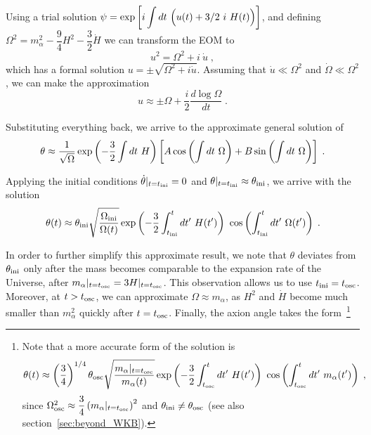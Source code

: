 \documentclass[11pt,a4paper]{article}
\begin{document}
Using a trial solution $\psi = \exp\left[  i \displaystyle \int d t \ \Big( u(t) +3/2 \ i \ H(t) \Big)  \right]$, and defining $\Omega^2 = m_{\alpha}^2 - \dfrac{9}{4} H^2 -  \dfrac{3}{2} \dot H $ we can transform the EOM to 
%
\begin{equation}
	u^2 = \Omega^2 + i \ \dot u \; ,
	\label{eq:eom_of_u}
\end{equation}
%
which has a formal solution $u = \pm \sqrt{\Omega^2 + i \dot u}$. Assuming that $\dot u \ll \Omega^2$ and $\dot \Omega \ll \Omega^2$, we can make the approximation
%
\begin{equation}
	u \approx \pm \Omega + \dfrac{i}{2} \dfrac{d \log \Omega}{d t} \;.
	\label{eq:u_approx}
\end{equation}


Substituting everything back, we arrive to the approximate general solution of  
%
\begin{equation}
	\theta \approx \dfrac{1}{\sqrt{\Omega}} \exp\left( -\dfrac{3}{2} \int d t \ H \right) \left[  A \cos\left(  \int d t \ \Omega \right) +  B \sin\left(  \int d t \ \Omega \right)     \right] \;. 
	\label{eq:general_solution_eom_approx}
\end{equation}

Applying the initial conditions $ \dot \theta |_{t=t_{\rm ini}{}} = 0$ and  $\theta|_{t=t_{\rm ini}{}} \approx \theta_{\rm ini}{}$, we arrive with the solution 
%
\begin{equation}
	\theta(t) \approx \theta_{\rm ini}{} \sqrt{ \dfrac{ \Omega_{\rm ini} }{\Omega (t)} } \exp\left( -\dfrac{3}{2} \int_{t_{\rm ini}{}}^t d t^\prime  \ H(t^\prime) \right) \  \cos\left(  \int_{t_{\rm ini}{}}^t d t^\prime  \ \Omega(t^\prime) \right)   \;.
	\label{eq:solution_eom_approx} 
\end{equation}


In order to further simplify this approximate result, we note that $\theta$ deviates from $\theta_{\rm ini}{}$ only after the mass becomes comparable to the expansion rate of the Universe, \ie after $m_{\alpha}|_{t = t_{\rm osc}{}} = 3 H|_{t = t_{\rm osc}{}}$. This observation allows us to use $t_{\rm ini}{} = t_{\rm osc}{}$.  Moreover, at $t> t_{\rm osc}{}$, we can approximate $\Omega \approx m_{\alpha}$, as $H^2$ and $\dot H$ become much smaller than $m_\alpha^2$ quickly after $t=t_{\rm osc}{}$. Finally, the axion angle takes the form~\footnote{Note that a more accurate form of the solution is 
	$$\theta(t) \approx \left( \dfrac{3}{4} \right)^{1/4} \theta_{\rm osc} \sqrt{ \dfrac{  m_\alpha{}|_{t=t_{\rm osc}{}}  }{m_\alpha{}  (t)} } \exp\left( -\dfrac{3}{2} \int_{t_{\rm osc}{}}^t d t^\prime  \ H(t^\prime) \right) \  \cos\left(  \int_{t_{\rm osc}{}}^t d t^\prime  \ m_\alpha{}(t^\prime) \right)\;,$$ since $\Omega_{\rm osc}^2 \approx \dfrac{3}{4} \left( m_\alpha{}|_{t = t_{\rm osc}{}} \right)^2$ and $\theta_{\rm ini}{} \neq \theta_{\rm osc}$ (see also section~\ref{sec:beyond_WKB}). 
}
\end{document}
